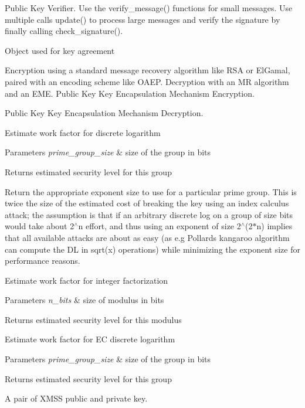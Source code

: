 Public Key Verifier. Use the verify\+\_\+message() functions for small messages. Use multiple calls update() to process large messages and verify the signature by finally calling check\+\_\+signature().

Object used for key agreement

Encryption using a standard message recovery algorithm like R\+SA or El\+Gamal, paired with an encoding scheme like O\+A\+EP. Decryption with an MR algorithm and an E\+ME. Public Key Key Encapsulation Mechanism Encryption.

Public Key Key Encapsulation Mechanism Decryption.

Estimate work factor for discrete logarithm 
\begin{DoxyParams}{Parameters}
{\em prime\+\_\+group\+\_\+size} & size of the group in bits \\
\hline
\end{DoxyParams}
\begin{DoxyReturn}{Returns}
estimated security level for this group
\end{DoxyReturn}
Return the appropriate exponent size to use for a particular prime group. This is twice the size of the estimated cost of breaking the key using an index calculus attack; the assumption is that if an arbitrary discrete log on a group of size bits would take about 2$^\wedge$n effort, and thus using an exponent of size 2$^\wedge$(2$\ast$n) implies that all available attacks are about as easy (as e.\+g Pollard\textquotesingle{}s kangaroo algorithm can compute the DL in sqrt(x) operations) while minimizing the exponent size for performance reasons.

Estimate work factor for integer factorization 
\begin{DoxyParams}{Parameters}
{\em n\+\_\+bits} & size of modulus in bits \\
\hline
\end{DoxyParams}
\begin{DoxyReturn}{Returns}
estimated security level for this modulus
\end{DoxyReturn}
Estimate work factor for EC discrete logarithm 
\begin{DoxyParams}{Parameters}
{\em prime\+\_\+group\+\_\+size} & size of the group in bits \\
\hline
\end{DoxyParams}
\begin{DoxyReturn}{Returns}
estimated security level for this group
\end{DoxyReturn}
A pair of X\+M\+SS public and private key.

